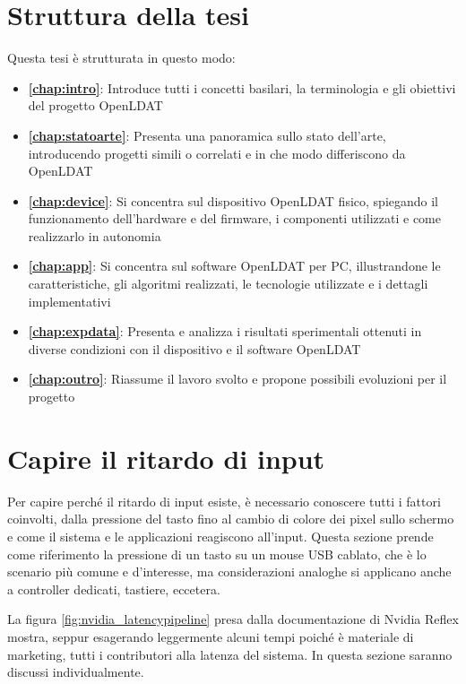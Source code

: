 \section{Struttura della tesi}
Questa tesi è strutturata in questo modo:
\begin{itemize}
	\item \textbf{\autoref{chap:intro}}: Introduce tutti i concetti basilari, la terminologia e gli obiettivi del progetto OpenLDAT
	\item \textbf{\autoref{chap:statoarte}}: Presenta una panoramica sullo stato dell'arte, introducendo progetti simili o correlati e in che modo differiscono da OpenLDAT
	\item \textbf{\autoref{chap:device}}: Si concentra sul dispositivo OpenLDAT fisico, spiegando il funzionamento dell'hardware e del firmware, i componenti utilizzati e come realizzarlo in autonomia
	\item \textbf{\autoref{chap:app}}: Si concentra sul software OpenLDAT per PC, illustrandone le caratteristiche, gli algoritmi realizzati, le tecnologie utilizzate e i dettagli implementativi
	\item \textbf{\autoref{chap:expdata}}: Presenta e analizza i risultati sperimentali ottenuti in diverse condizioni con il dispositivo e il software OpenLDAT
	\item \textbf{\autoref{chap:outro}}: Riassume il lavoro svolto e propone possibili evoluzioni per il progetto
\end{itemize} 

\section{Capire il ritardo di input}
Per capire perché il ritardo di input esiste, è necessario conoscere tutti i fattori coinvolti, dalla pressione del tasto fino al cambio di colore dei pixel sullo schermo e come il sistema e le applicazioni reagiscono all'input. Questa sezione prende come riferimento la pressione di un tasto su un mouse USB cablato, che è lo scenario più comune e d'interesse, ma considerazioni analoghe si applicano anche a controller dedicati, tastiere, eccetera.

La figura \ref{fig:nvidia_latencypipeline} presa dalla documentazione di Nvidia Reflex mostra, seppur esagerando leggermente alcuni tempi poiché è materiale di marketing, tutti i contributori alla latenza del sistema. In questa sezione saranno discussi individualmente.

